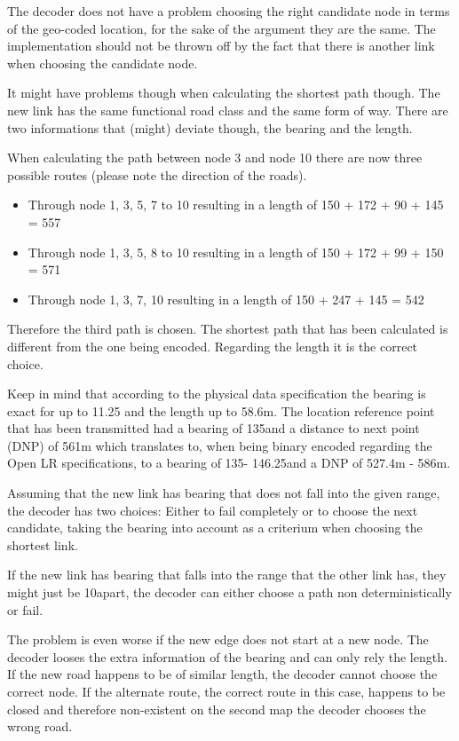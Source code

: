 The decoder does not have a problem choosing the right candidate node in terms of the geo-coded location, for the sake of the argument they are the same. The implementation should not be thrown off by the fact that there is another link when choosing the candidate node.

It might have problems though when calculating the shortest path though. The new link has the same functional road class and the same form of way. There are two informations that (might) deviate though, the bearing and the length.

When calculating the path between node 3 and node 10 there are now three possible routes (please note the direction of the roads). 

\begin{itemize}
	\item Through node 1, 3, 5, 7 to 10 resulting in a length of 150 + 172 + 90 + 145 = 557  
	\item Through node 1, 3, 5, 8 to 10 resulting in a length of 150 + 172 + 99 + 150 = 571
	\item Through node 1, 3, 7, 10 resulting in a length of 150 + 247 + 145 = 542  
\end{itemize}	

Therefore the third path is chosen. The shortest path that has been calculated is different from the one being encoded. Regarding the length it is the correct choice.

Keep in mind that according to the physical data specification the bearing is exact for up to 11.25 \degree and the length up to 58.6m. The location reference point that 
has been transmitted had a bearing of 135\degree and a distance to next point (DNP) of 561m which translates to, when being binary encoded regarding the Open LR specifications, to a bearing of 135\degree - 146.25\degree and a DNP of 527.4m - 586m.

Assuming that the new link has bearing that does not fall into the given range, the decoder has two choices: Either to fail completely or to choose the next candidate, taking the bearing into account as a criterium when choosing the shortest link.

If the new link has bearing that falls into the range that the other link has, they might just be 10\degree apart, the decoder can either choose a path non deterministically or fail.

The problem is even worse if the new edge does not start at a new node. The decoder looses the extra information of the bearing and can only rely the length. If the new road happens to be of similar length, the decoder cannot choose the correct node. If the alternate route, the correct route in this case, happens to be closed and therefore non-existent on the second map the decoder chooses the wrong road.

